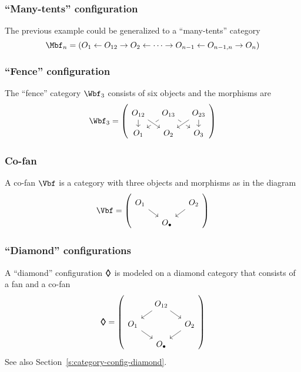 \subsubsection{``Many-tents'' configuration}
\label{s:config-examples-manytents} 
  The previous example could be generalized to a ``many-tents'' category
  \[
    \Mbf_{n}
    =
    (O_{1}\ot O_{12}\to O_{2}\ot\cdots\to O_{n-1}\ot O_{n-1,n}\to O_{n})
  \]

\subsubsection{``Fence'' configuration}
\label{s:config-examples-fence} 
  The ``fence'' category $\Wbf_{3}$ consists of six objects and the
  morphisms are 
  \[
    \Wbf_{3}
    =
    \left(
    \begin{tikzcd}[ampersand replacement=\&,row sep=small, column sep=small]
      O_{12}
      \arrow{d}
      \&
      O_{13}
      \arrow{dr}
      \arrow{dl}
      \&
      O_{23}
      \arrow{d}
      \\
      O_{1}
      \&
      O_{2}
      \arrow[leftarrow, crossing over]{ur}
      \arrow[leftarrow, crossing over]{ul}
      \&
      O_{3}      
    \end{tikzcd}
    \right)
  \]

\subsubsection{Co-fan}\label{s:config-examples-cofan}
A co-fan $\Vbf$ is a category with three objects and morphisms as in the diagram
\[
\Vbf =
\left(  \begin{tikzcd}[row sep=small, column sep=small]
\mbox{}
O_{1}
\arrow{dr}{}
& 
&
O_{2}
\arrow{dl}{}
\\
\mbox{}
&
O_{\bullet}
&
\end{tikzcd} \right)
\]

\subsubsection{``Diamond'' configurations}
\label{s:config-examples-diamond} 
  A ``diamond'' configuration ${\bm\Diamond}$ is modeled on a diamond category
  that consists of a fan and a co-fan
  \[
  \dia =
  \left(  
  \begin{tikzcd}[ampersand replacement=\&,row sep=small, column sep=small]
    \mbox{}
    \& 
    O_{12}
    \arrow{dl}{}
    \arrow{dr}{}
    \&
    \\
    O_{1}
    \arrow{dr}{}
    \& 
    \&
    O_{2}
    \arrow{dl}{}
    \\
    \mbox{}
    \&
    O_{\bullet}
    \&
  \end{tikzcd} \right)
  \]
  See also Section~\ref{s:category-config-diamond}.

